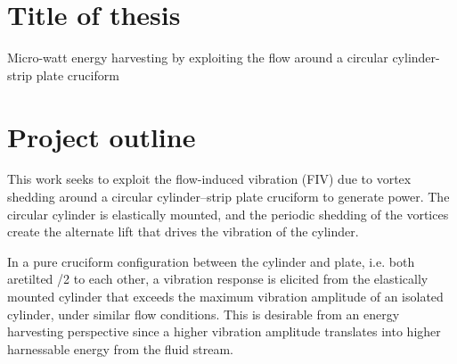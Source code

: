 \documentclass[a4paper]{article}
\begin{document}
\newcommand{\uon}{\unit{0.1}{\metre\per\second}}
\newcommand{\utw}{\unit{0.2}{\metre\per\second}}
\newcommand{\uth}{\unit{0.3}{\metre\per\second}}
\newcommand{\ufo}{\unit{0.4}{\metre\per\second}}
\newcommand{\ufi}{\unit{0.5}{\metre\per\second}}
\newcommand{\usi}{\unit{0.6}{\metre\per\second}}
\newcommand{\use}{\unit{0.7}{\metre\per\second}}
\newcommand{\uei}{\unit{0.8}{\metre\per\second}}
\newcommand{\uni}{\unit{0.9}{\metre\per\second}}
\newcommand{\ute}{\unit{1.0}{\metre\per\second}}
\newcommand{\uel}{\unit{1.1}{\metre\per\second}}
\newcommand{\utv}{\unit{1.2}{\metre\per\second}}
\newcommand{\utt}{\unit{1.3}{\metre\per\second}}

\newcommand{\ptlt}{$\theta_{plate}$}
\newcommand{\rze}{\unit{0}{\radian}}
\newcommand{\ron}{\unit{\pi/8}{\radian}}
\newcommand{\rtw}{\unit{\pi/4}{\radian}}
\newcommand{\rth}{\unit{3\pi/8}{\radian}}
\newcommand{\rfo}{\unit{\pi/2}{\radian}}

\newcommand{\ypl}{$y^{+}$} %
\newcommand{\ured}{$U^{*}$} %

\newcommand{\uron}{$2.3$}
\newcommand{\urtw}{$4.5$}
\newcommand{\urth}{$6.8$}
\newcommand{\urfo}{$9.1$}
\newcommand{\urfi}{$11.4$}
\newcommand{\ursi}{$13.6$}
\newcommand{\urse}{$15.9$}
\newcommand{\urei}{$18.2$}
\newcommand{\urni}{$20.5$}
\newcommand{\urte}{$22.7$}
\newcommand{\urel}{$25.0$}
\newcommand{\urtv}{$27.3$}
\newcommand{\urtt}{$29.5$}

\newcommand{\es}{$=$}

\section{Title of thesis}
Micro-watt energy harvesting by exploiting the flow around a circular cylinder-strip plate cruciform

\section{Project outline} \label{outline}
This work seeks to exploit the flow-induced vibration (FIV) due to vortex shedding around a circular cylinder--strip plate cruciform to generate power. The circular cylinder is elastically mounted, and the periodic shedding of the vortices create the alternate lift that drives the vibration of the cylinder.

In a pure cruciform configuration between the cylinder and plate, i.e. both aretilted \rfo{} to each other, a vibration response is elicited from the elastically mounted cylinder that exceeds the maximum vibration amplitude of an isolated cylinder, under similar flow conditions. This is desirable from an energy harvesting perspective since a higher vibration amplitude translates into higher harnessable energy from the fluid stream.
\end{document}
